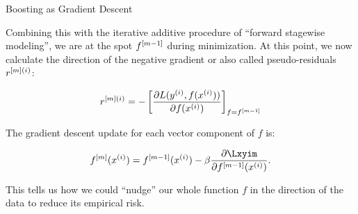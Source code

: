 \begin{vbframe}{Boosting as Gradient Descent}

\vspace*{0.2cm}
Combining this with the iterative additive procedure
of \enquote{forward stagewise modeling}, we are at the spot $f^{[m-1]}$ during minimization.
At this point, we now calculate the direction of the negative gradient or also called pseudo-residuals $r^{[m](i)}$:

$$ r^{[m](i)} = -\left[\frac{\partial L(y^{(i)}, f(x^{(i)}))}{\partial f(x^{(i)})}\right]_{f=f^{[m-1]}} $$

\lz

The gradient descent update for each vector component of $f$ is:

$$
  \fm (\xi) =  \fmd (\xi) - \beta \fp{\Lxyim}{\fmd (\xi)}.
$$

This tells us how we could \enquote{nudge} our whole function $f$ in the direction of the data to
reduce its empirical risk.

\end{vbframe}


